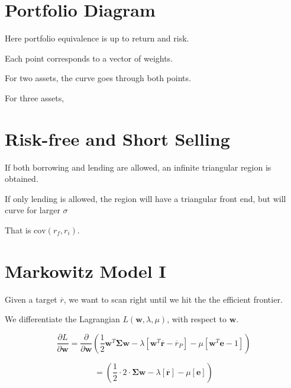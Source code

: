 \section{Portfolio Diagram}



Here portfolio equivalence is up to return and risk. 

Each point corresponds to a vector of weights. 




For two assets, the curve goes through both points. 

For three assets, 


\section{Risk-free and Short Selling}

If both borrowing and lending are allowed, an infinite
triangular region is obtained.

If only lending is allowed, the region will have a
triangular front end, but will curve for larger $\sigma$


That is $\text{cov}(r_f, r_i)$. 


\section{Markowitz Model I}




Given a target $\overline{r}$, we want to scan right until 
we hit the the efficient frontier. 




We differentiate the Lagrangian $L(\bm{w}, \lambda, \mu)$, with respect to $\bm{w}$.

$$\frac{\partial L}{\partial \bm{w}} = 
\frac{\partial}{\partial \bm{w}} \left(\frac{1}{2} \bm{w}^T\bm{\Sigma}\bm{w} 
- \lambda \left[\bm{w}^{T}\overline{\bm{r}} - \overline{r}_P\right]
- \mu \left[\bm{w}^{T}\bm{e} - 1 \right] \right)$$

$$= 
\left(\frac{1}{2} \cdot 2 \cdot \bm{\Sigma}\bm{w} 
- \lambda \left[\overline{\bm{r}} \right]
- \mu \left[\bm{e}\right] \right)
$$

